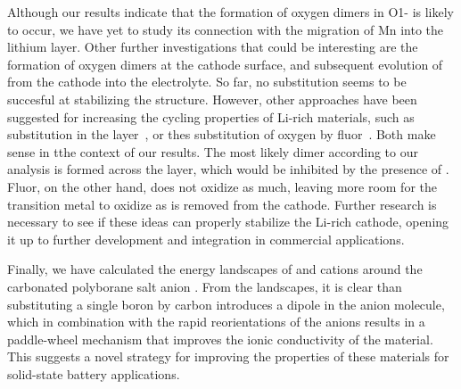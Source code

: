 \begin{refsection}
Although our results indicate that the formation of oxygen dimers in 
O1- is likely to occur, we have yet to study its connection 
with the migration of Mn into the lithium layer. Other further investigations 
that could be interesting are the formation of oxygen dimers at the cathode 
surface, and subsequent evolution of  from the cathode into the 
electrolyte. So far, no substitution seems to be succesful at stabilizing 
the structure. However, other approaches have been suggested for 
increasing the cycling properties of Li-rich materials, such as  
substitution in the  layer~\cite{Yang2017}, or thes substitution of 
oxygen by fluor~\cite{Richards2017, Kapylou2017}. Both make sense in tthe context of 
our results. The most likely dimer according to our analysis is formed 
across the  layer, which would be inhibited by the presence of . 
Fluor, on the other hand, does not oxidize  as much, leaving more 
room for the transition metal to oxidize as  is removed from the 
cathode. Further research is necessary to see if these ideas can properly 
stabilize the Li-rich cathode, opening it up to further development and 
integration in commercial applications.

Finally, we have calculated the energy landscapes of  and  
cations around the carbonated polyborane salt anion \ce{[CB11H12]^{-}}. From 
the landscapes, it is clear than substituting a single boron by carbon introduces 
a dipole in the anion molecule, which in combination with the rapid reorientations 
of the anions results in a paddle-wheel mechanism that improves the ionic 
conductivity of the material. This suggests a novel strategy for improving 
the properties of these materials for solid-state battery applications.
 
\printbibliography

\end{refsection} 
